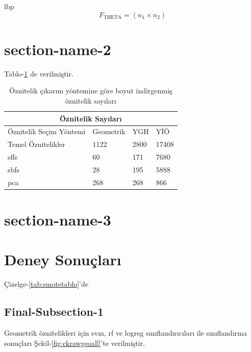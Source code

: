 \acrlong{lbp} \lipsum[3]
\begin{equation}
F_{ \text{THETA} } = (n_{1} \times n_{2})
\label{eq:result_lbp}%
\end{equation}

\section{section-name-2}

\lipsum[22-25]
Tablo-\ref{tab:featuresize} de verilmiştir. 

\begin{table}[hpb]
    \centering
    \caption{Öznitelik çıkarım yöntemine göre boyut indirgenmiş öznitelik sayıları}
    \begin{tabular}{ |p{4.5cm}||p{2.5cm}|p{2.5cm}|p{2.5cm}|  }
     \hline
     \multicolumn{4}{|c|}{Öznitelik Sayıları} \\
     \hline
     Öznitelik Seçim Yöntemi& Geometrik & YGH & YİÖ\\
     \hline
     Temel Öznitelikler   & 1122    &2800&   17408\\
     \acrshort{sffs} &   60  & 171   &7680\\
     \acrshort{sbfs} & 28 & 195&  5888\\
     \acrshort{pca} & 268 & 268&  866\\
     \hline
    \end{tabular}
    \label{tab:featuresize}
\end{table}

\lipsum[3]

\section{section-name-3}

\lipsum[1-2]

\section{Deney Sonuçları}


 Çizelge-\ref{tab:smotetablo}'de 
 \lipsum[3]

\subsection{Final-Subsection-1}

Geometrik öznitelikleri için \acrshort{svm}, \acrshort{rf} ve \acrshort{logreg} sınıflandırıcıları ile sınıflandırma sonuçları  Şekil-\ref{fig:ckrawgeoall}'te verilmiştir. 

